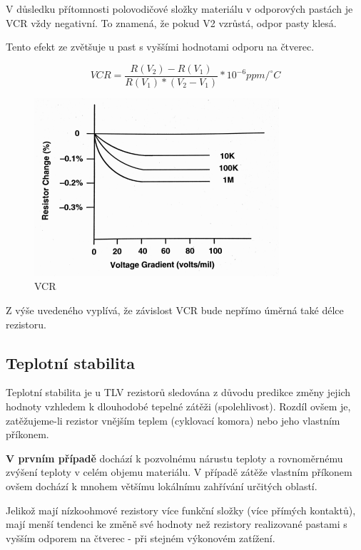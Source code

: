 V důsledku přítomnosti polovodičové složky materiálu v odporových pastách je VCR vždy
negativní. To znamená, že pokud V2 vzrůstá, odpor pasty klesá.


Tento efekt ze zvětšuje u past s vyššími hodnotami odporu na čtverec.

\begin{equation}
VCR = \frac{R(V_{2})-R(V_{1})}{R(V_{1})*(V_{2}-V_{1})}*10^{-6}ppm/^{\circ}C
\end{equation}

\begin{figure}[h]
   \begin{center}
     \includegraphics[scale=1]{images/VCR.png}
   \end{center}
   \caption{VCR}
\end{figure}

Z výše uvedeného vyplívá, že závislost VCR bude nepřímo úměrná také délce rezistoru.

\subsection{Teplotní stabilita}
Teplotní stabilita je u TLV rezistorů sledována z důvodu predikce změny jejich hodnoty
vzhledem k dlouhodobé tepelné zátěži (spolehlivost). Rozdíl ovšem je, zatěžujeme-li rezistor vnějším teplem (cyklovací komora) nebo jeho vlastním příkonem.

\textbf{V prvním případě} dochází k pozvolnému nárustu teploty a rovnoměrnému zvýšení teploty v celém objemu materiálu. V případě zátěže vlastním příkonem ovšem dochází k mnohem většímu lokálnímu zahřívání určitých oblastí.

Jelikož mají nízkoohmové rezistory více funkční složky (více přímých kontaktů), mají menší tendenci ke změně své hodnoty než rezistory realizované pastami s vyšším odporem na čtverec - při stejném výkonovém zatížení.

